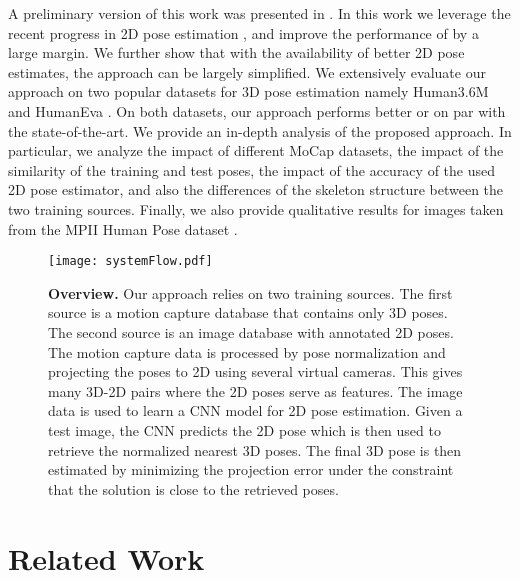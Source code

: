 \documentclass[10pt,journal,compsoc]{IEEEtran}
\begin{document}
A preliminary version of this work was presented in \cite{Yasin_2016_CVPR}. In this work we leverage the recent progress in 2D 
pose estimation \cite{toshev2014deeppose, iqbalFG2017actionpose, carreira2015human, pishchulin2016deepcut, wei2016convolutional, hu2016bottom, 
insafutdinov2016deepercut, newell2016eccv, bulat2016human, georgia2016eccv, rafi2016bmvc, chu2017CVPRmulti}, and improve the performance of \cite{Yasin_2016_CVPR}
by a large margin. We further show that with the availability of better 2D pose estimates, the approach \cite{Yasin_2016_CVPR} can be largely
simplified. We extensively evaluate our approach on two popular datasets for 3D pose estimation namely Human3.6M \cite{h36m_pami} and HumanEva \cite{Sigal_2010}.
On both datasets, our approach performs better or on par with the state-of-the-art. We provide an in-depth analysis of the proposed approach. 
In particular, we analyze the impact of different MoCap datasets, the impact of the similarity of the training and test poses,
the impact of the accuracy of the used 2D pose estimator, and also the differences of the skeleton structure between the two training sources.
Finally, we also provide qualitative results for images taken from the MPII Human Pose dataset \cite{andriluka14cvpr}.

\begin{figure*}[t]
\begin{center}
 \texttt{[image: systemFlow.pdf]}
\end{center}
\caption{
{\bf Overview.} Our approach relies on two training sources. The first source is a motion capture database that contains only 3D poses. 
The second source is an image database with annotated 2D poses. The motion capture data is processed by pose normalization and projecting 
the poses to 2D using several virtual cameras. This gives many 3D-2D pairs where the 2D poses serve as features. The image data is used
to learn a CNN model for 2D pose estimation. Given a test image, the CNN predicts the 2D pose which is then used to retrieve the normalized 
nearest 3D poses. The final 3D pose is then estimated by minimizing the projection error under the constraint that the solution is close to
the retrieved poses. 
}
\label{fig:sysflow}
\end{figure*}


\section{Related Work}
\end{document}
